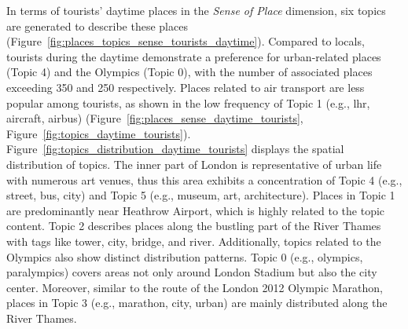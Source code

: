 \documentclass{article}
\theoremstyle{remark}
\begin{document}
In terms of tourists' daytime places in the \textit{Sense of Place} dimension, six topics are generated to describe these places (Figure~\ref{fig:places_topics_sense_tourists_daytime}). Compared to locals, tourists during the daytime demonstrate a preference for urban-related places (Topic 4) and the Olympics (Topic 0), with the number of associated places exceeding 350 and 250 respectively. Places related to air transport are less popular among tourists, as shown in the low frequency of Topic 1 (e.g., lhr, aircraft, airbus) (Figure~\ref{fig:places_sense_daytime_tourists}, Figure~\ref{fig:topics_daytime_tourists}). Figure~\ref{fig:topics_distribution_daytime_tourists} displays the spatial distribution of topics. The inner part of London is representative of urban life with numerous art venues, thus this area exhibits a concentration of Topic 4 (e.g., street, bus, city) and Topic 5 (e.g., museum, art, architecture). Places in Topic 1 are predominantly near Heathrow Airport, which is highly related to the topic content. Topic 2 describes places along the bustling part of the River Thames with tags like tower, city, bridge, and river. Additionally, topics related to the Olympics also show distinct distribution patterns. Topic 0 (e.g., olympics, paralympics) covers areas not only around London Stadium but also the city center. Moreover, similar to the route of the London 2012 Olympic Marathon, places in Topic 3 (e.g., marathon, city, urban) are mainly distributed along the River Thames.
\end{document}
